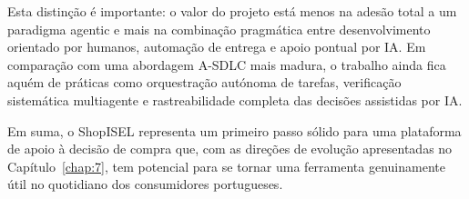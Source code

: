 Esta distinção é importante: o valor do projeto está menos na adesão total a um paradigma agentic e mais na combinação pragmática entre desenvolvimento orientado por humanos, automação de entrega e apoio pontual por IA. Em comparação com uma abordagem A-SDLC mais madura, o trabalho ainda fica aquém de práticas como orquestração autónoma de tarefas, verificação sistemática multiagente e rastreabilidade completa das decisões assistidas por IA.

Em suma, o ShopISEL representa um primeiro passo sólido para uma plataforma de apoio à decisão de compra que, com as direções de evolução apresentadas no Capítulo~\ref{chap:7}, tem potencial para se tornar uma ferramenta genuinamente útil no quotidiano dos consumidores portugueses.
